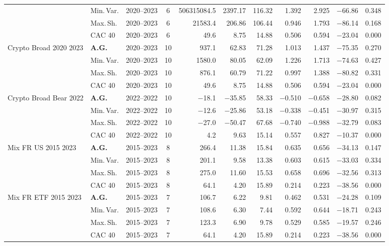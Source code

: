 \begin{longtable}{p{2.6cm} l c c r r r r r r r}
 & Min.\,Var. & 2020--2023 & 6 & 506315084.5 & 2397.17 & 116.32 & 1.392 & 2.925 & $-$66.86 & 0.348 \\
 & Max.\,Sh. & 2020--2023 & 6 & 21583.4 & 206.86 & 106.44 & 0.946 & 1.793 & $-$86.14 & 0.168 \\
 & CAC 40 & 2020--2023 & 6 & 49.6 & 8.75 & 14.88 & 0.506 & 0.594 & $-$23.04 & 0.000 \\
\midrule
Crypto Broad 2020 2023 & \textbf{A.G.} & 2020--2023 & 10 & 937.1 & 62.83 & 71.28 & 1.013 & 1.437 & $-$75.35 & 0.270 \\
 & Min.\,Var. & 2020--2023 & 10 & 1580.0 & 80.05 & 62.09 & 1.226 & 1.713 & $-$74.63 & 0.427 \\
 & Max.\,Sh. & 2020--2023 & 10 & 876.1 & 60.79 & 71.22 & 0.997 & 1.388 & $-$80.82 & 0.331 \\
 & CAC 40 & 2020--2023 & 10 & 49.6 & 8.75 & 14.88 & 0.506 & 0.594 & $-$23.04 & 0.000 \\
\midrule
Crypto Broad Bear 2022 & \textbf{A.G.} & 2022--2022 & 10 & $-$18.1 & $-$35.85 & 58.33 & $-$0.510 & $-$0.658 & $-$28.80 & 0.082 \\
 & Min.\,Var. & 2022--2022 & 10 & $-$12.6 & $-$25.86 & 53.18 & $-$0.338 & $-$0.451 & $-$30.97 & 0.315 \\
 & Max.\,Sh. & 2022--2022 & 10 & $-$27.0 & $-$50.47 & 67.68 & $-$0.740 & $-$0.988 & $-$32.79 & 0.083 \\
 & CAC 40 & 2022--2022 & 10 & 4.2 & 9.63 & 15.14 & 0.557 & 0.827 & $-$10.37 & 0.000 \\
\midrule
Mix FR US 2015 2023 & \textbf{A.G.} & 2015--2023 & 8 & 266.4 & 11.38 & 15.84 & 0.635 & 0.656 & $-$34.13 & 0.147 \\
 & Min.\,Var. & 2015--2023 & 8 & 201.1 & 9.58 & 13.38 & 0.603 & 0.615 & $-$33.03 & 0.334 \\
 & Max.\,Sh. & 2015--2023 & 8 & 275.0 & 11.60 & 15.53 & 0.658 & 0.696 & $-$32.56 & 0.313 \\
 & CAC 40 & 2015--2023 & 8 & 64.1 & 4.20 & 15.89 & 0.214 & 0.223 & $-$38.56 & 0.000 \\
\midrule
Mix FR ETF 2015 2023 & \textbf{A.G.} & 2015--2023 & 7 & 106.7 & 6.22 & 9.81 & 0.462 & 0.531 & $-$24.28 & 0.109 \\
 & Min.\,Var. & 2015--2023 & 7 & 108.6 & 6.30 & 7.44 & 0.592 & 0.644 & $-$18.71 & 0.243 \\
 & Max.\,Sh. & 2015--2023 & 7 & 123.3 & 6.90 & 9.78 & 0.529 & 0.585 & $-$19.57 & 0.246 \\
 & CAC 40 & 2015--2023 & 7 & 64.1 & 4.20 & 15.89 & 0.214 & 0.223 & $-$38.56 & 0.000 \\

\end{longtable}
